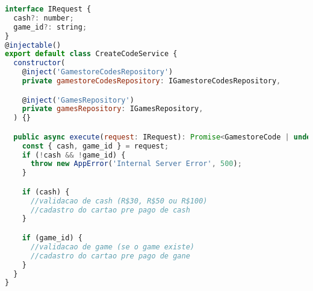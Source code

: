 \begin{lstlisting}[language=JavaScript, caption={Implementação de cadastro de códigos},captionpos=b, label=alg:createcodeservice]
interface IRequest {
  cash?: number;
  game_id?: string;
}
@injectable()
export default class CreateCodeService {
  constructor(
    @inject('GamestoreCodesRepository')
    private gamestoreCodesRepository: IGamestoreCodesRepository,

    @inject('GamesRepository')
    private gamesRepository: IGamesRepository,
  ) {}

  public async execute(request: IRequest): Promise<GamestoreCode | undefined> {
    const { cash, game_id } = request;
    if (!cash && !game_id) {
      throw new AppError('Internal Server Error', 500);
    }

    if (cash) {
      //validacao de cash (R$30, R$50 ou R$100)
      //cadastro do cartao pre pago de cash
    }

    if (game_id) {
      //validacao de game (se o game existe)
      //cadastro do cartao pre pago de gane
    }
  }
}

\end{lstlisting}